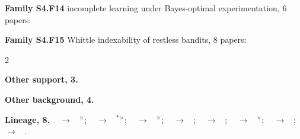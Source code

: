\documentclass[10pt]{article}
\newcommand{\memb}[1]{\par\smallskip\textbf{#1}\quad}
\begin{document}
\memb{Family S4.F14} incomplete learning under Bayes-optimal experimentation, 6 papers: {\footnotesize \citetext{\citealp{Brezzi-incomplete00}; \citealp{Rothschild-twoarmed74}; \citealp{Easley-controlling88}; \citealp{Kiefer-optimal89}; \citealp{Aghion-optimal91}; \citealp{Brezzi-optimal02}}}

\memb{Family S4.F15} Whittle indexability of restless bandits, 8 papers: {\footnotesize \citetext{\citealp{Chen-uncertainty21}; \citealp{NinoMora-restless01}; \citealp{LiuZhao-indexability10}; \citealp{LeNy-scheduling11}; \citealp{Dance-when15}; \citealp{NinoMora-markovian23}; \citealp{Ornee-remote23}; \citealp{NinoMora-threshold26}}}

\begin{multicols}{2}
\memb{Other support, 3.} \citetext{\citealp{Lattimore-regret16}; \citealp{Bastani-mostly21}; \citealp{Slivkins-greedy25}}

\memb{Other background, 4.} {\footnotesize \citetext{\citealp{Lai-asymptotically85}; \citealp{Mersereau-structured09}; \citealp{Kaufmann-bayesian18}; \citealp{Kalvit-closer21}}}

\end{multicols}
\memb{Lineage, 8.} {\footnotesize \citeauthor{Gittins-bandit79}~\citeyear{Gittins-bandit79} $\to$ \citeauthor{Lattimore-regret16}~\citeyear{Lattimore-regret16}$^\times$; \citeauthor{Whittle-restless88}~\citeyear{Whittle-restless88} $\to$ \citeauthor{LiuZhao-indexability10}~\citeyear{LiuZhao-indexability10}$^\ast$$^\times$; \citeauthor{Whittle-restless88}~\citeyear{Whittle-restless88} $\to$ \citeauthor{Chen-uncertainty21}~\citeyear{Chen-uncertainty21}$^\times$; \citeauthor{Brezzi-incomplete00}~\citeyear{Brezzi-incomplete00} $\to$ \citeauthor{Brezzi-optimal02}~\citeyear{Brezzi-optimal02}; \citeauthor{Brezzi-incomplete00}~\citeyear{Brezzi-incomplete00} $\to$ \citeauthor{Mersereau-structured09}~\citeyear{Mersereau-structured09}; \citeauthor{LiuZhao-indexability10}~\citeyear{LiuZhao-indexability10} $\to$ \citeauthor{Meshram-whittle16}~\citeyear{Meshram-whittle16}$^\times$; \citeauthor{Keskin-incomplete18}~\citeyear{Keskin-incomplete18} $\to$ \citeauthor{Bastani-mostly21}~\citeyear{Bastani-mostly21}; \citeauthor{Keskin-incomplete18}~\citeyear{Keskin-incomplete18} $\to$ \citeauthor{Slivkins-greedy25}~\citeyear{Slivkins-greedy25}.}
\end{document}

